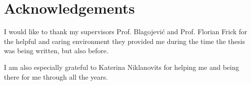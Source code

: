 \section*{Acknowledgements}
I would like to thank my supervisors Prof. Blagojevi\'c and Prof. Florian Frick for the helpful and caring environment they provided me during the time the thesis was being written, but also before.

I am also especially grateful to Katerina Niklanovits for helping me and being there for me through all the years.
